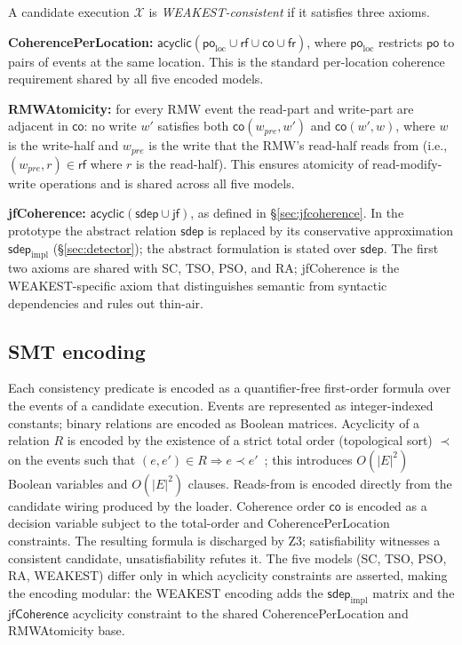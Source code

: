 \documentclass{llncs}
\newcommand{\sdep}{\mathsf{sdep}}
\newcommand{\rf}{\mathsf{rf}}
\newcommand{\jf}{\mathsf{jf}}
\newcommand{\co}{\mathsf{co}}
\newcommand{\fr}{\mathsf{fr}}
\newcommand{\po}{\mathsf{po}}
\newcommand{\sdepimpl}{\mathsf{sdep}_{\mathrm{impl}}}
\newcommand{\jfCoherence}{\textsf{jfCoherence}}
\begin{document}
A candidate execution $\mathcal{X}$ is \emph{WEAKEST-consistent} if it
satisfies three axioms.

\textbf{CoherencePerLocation:} $\mathsf{acyclic}(\po_{\mathrm{loc}} \allowbreak \cup \rf \allowbreak \cup \co \allowbreak \cup \fr)$, where $\po_{\mathrm{loc}}$ restricts $\po$ to pairs of
events at the same location. This is the standard per-location coherence
requirement shared by all five encoded models.

\textbf{RMWAtomicity:} for every RMW event the read-part and write-part are
adjacent in $\co$: no write $w'$ satisfies both $\co(w_{\mathit{pre}}, w')$ and $\co(w',
w)$, where $w$ is the write-half and $w_{\mathit{pre}}$ is the write that the
RMW's read-half reads from (i.e., $(w_{\mathit{pre}}, r) \in \rf$ where $r$
is the read-half). This ensures atomicity of read-modify-write operations
and is shared across all five models.

\textbf{jfCoherence:} $\mathsf{acyclic}(\sdep \cup \jf)$, as defined in
\S\ref{sec:jfcoherence}. In the prototype the abstract relation $\sdep$ is
replaced by its conservative approximation $\sdepimpl$ (\S\ref{sec:detector});
the abstract formulation is stated over $\sdep$. The first two axioms are
shared with SC, TSO, PSO, and RA; jfCoherence is the WEAKEST-specific axiom
that distinguishes semantic from syntactic dependencies and rules out thin-air.

\subsection{SMT encoding}
\label{sec:smt}

Each consistency predicate is encoded as a quantifier-free first-order formula
over the events of a candidate execution. Events are represented as
integer-indexed constants; binary relations are encoded as Boolean matrices.
Acyclicity of a relation $R$ is encoded by the existence of a strict total
order (topological sort) $\prec$ on the events such that $(e, e') \in R
\Rightarrow e \prec e'$~\cite{gavrilenko2019bmc}; this introduces $O(|E|^2)$
Boolean variables and $O(|E|^2)$ clauses. Reads-from is encoded directly from
the candidate wiring produced by the loader. Coherence order $\co$ is encoded
as a decision variable subject to the total-order and CoherencePerLocation
constraints. The resulting formula is discharged by Z3; satisfiability
witnesses a consistent candidate, unsatisfiability refutes it. The five models
(SC, TSO, PSO, RA, WEAKEST) differ only in which acyclicity constraints are asserted, making the encoding modular: the WEAKEST encoding adds the $\sdepimpl$ matrix and the $\jfCoherence$ acyclicity constraint to the shared
CoherencePerLocation and RMWAtomicity base.
\end{document}
